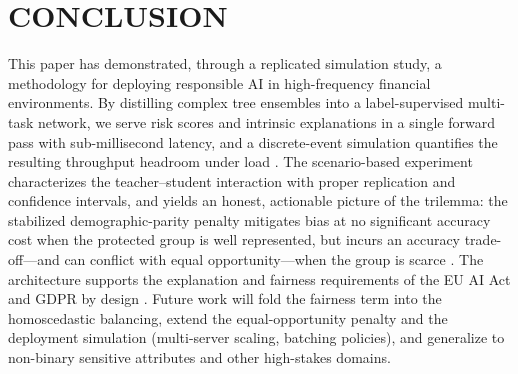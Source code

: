 \documentclass{wscpaperproc}
\theoremstyle{wsc}
\begin{document}
\section{CONCLUSION}
\label{sec:conclusion}

This paper has demonstrated, through a replicated simulation study, a methodology for deploying responsible AI in high-frequency financial environments. By distilling complex tree ensembles into a label-supervised multi-task network, we serve risk scores and intrinsic explanations in a single forward pass with sub-millisecond latency, and a discrete-event simulation quantifies the resulting throughput headroom under load \cite{jethani2022fastshap,Boehm2025ScalableSHAP}. The scenario-based experiment characterizes the teacher--student interaction with proper replication and confidence intervals, and yields an honest, actionable picture of the trilemma: the stabilized demographic-parity penalty mitigates bias at no significant accuracy cost when the protected group is well represented, but incurs an accuracy trade-off---and can conflict with equal opportunity---when the group is scarce \cite{Hardt2016Equality}. The architecture supports the explanation and fairness requirements of the EU AI Act and GDPR by design \cite{Chee2024EULaw,Hunton2023CJEU}. Future work will fold the fairness term into the homoscedastic balancing, extend the equal-opportunity penalty and the deployment simulation (multi-server scaling, batching policies), and generalize to non-binary sensitive attributes and other high-stakes domains.





\end{document}

